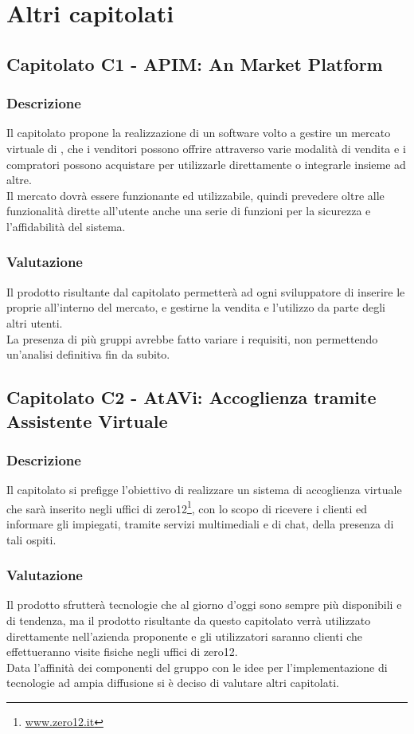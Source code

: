 \section{Altri capitolati}

\subsection{Capitolato C1 - APIM: An  Market Platform}
\subsubsection{Descrizione}
Il capitolato propone la realizzazione di un software volto a gestire un mercato virtuale di , che i venditori possono offrire attraverso varie modalità di vendita e i compratori possono acquistare per utilizzarle direttamente o integrarle insieme ad altre.\\
Il mercato dovrà essere funzionante ed utilizzabile, quindi prevedere oltre alle funzionalità dirette all'utente anche una serie di funzioni per la sicurezza e l'affidabilità del sistema.

\subsubsection{Valutazione}
Il prodotto risultante dal capitolato permetterà ad ogni sviluppatore di inserire le proprie  all'interno del mercato, e gestirne la vendita e l'utilizzo da parte degli altri utenti.\\
La presenza di più gruppi avrebbe fatto variare i requisiti, non permettendo un'analisi definitiva fin da subito.

\subsection{Capitolato C2 - AtAVi: Accoglienza tramite Assistente Virtuale}
\subsubsection{Descrizione}
Il capitolato si prefigge l'obiettivo di realizzare un sistema di accoglienza virtuale che sarà inserito negli uffici di zero12\footnote{\url{www.zero12.it}}, con lo scopo di ricevere i clienti ed informare gli impiegati, tramite servizi multimediali e di chat, della presenza di tali ospiti.

\subsubsection{Valutazione}
Il prodotto sfrutterà tecnologie che al giorno d'oggi sono sempre più disponibili e di tendenza, ma il prodotto risultante da questo capitolato verrà utilizzato direttamente nell'azienda proponente e gli utilizzatori saranno clienti che effettueranno visite fisiche negli uffici di zero12.\\
Data l'affinità dei componenti del gruppo con le idee per l'implementazione di tecnologie  ad ampia diffusione si è deciso di valutare altri capitolati.

